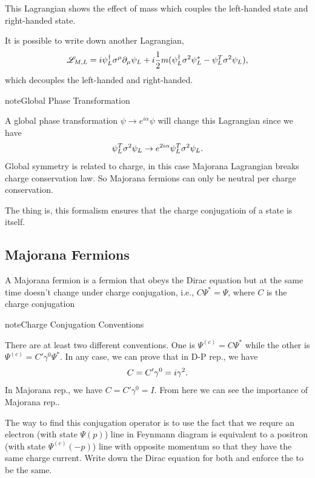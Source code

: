\documentclass[letterpaper,12pt,english]{sphinxmanual}
\begin{document}
This Lagrangian shows the effect of mass which couples the left-handed state and right-handed state.

It is possible to write down another Lagrangian,
\begin{gather}
\begin{split}\mathscr{L}_{M,L} = i\psi_L^\dagger \sigma^\mu \partial_\mu \psi_L + i \frac{1}{2}m( \psi_L^\dagger \sigma^2 \psi_L^* - \psi_L^T \sigma^2 \psi_L),\end{split}\notag
\end{gather}
which decouples the left-handed and right-handed.

\begin{notice}{note}{Global Phase Transformation}

A global phase transformation \(\psi\to e^{i\alpha} \psi\) will change this Lagrangian since we have
\begin{gather}
\begin{split}\psi_L^T\sigma^2 \psi_L \to e^{2i\alpha}\psi_L^T \sigma^2 \psi_L.\end{split}\notag
\end{gather}
Global symmetry is related to charge, in this case Majorana Lagrangian breaks charge conservation law. So Majorana fermions can only be neutral per charge conservation.
\end{notice}

The thing is, this formalism ensures that the charge conjugatioin of a state is itself.


\subsection{Majorana Fermions}
\label{mass:majorana-fermions}
A Majorana fermion is a fermion that obeys the Dirac equation but at the same time doesn't change under charge conjugation, i.e., \(C \Psi^* = \Psi\), where \(C\) is the charge conjugation

\begin{notice}{note}{Charge Conjugation Conventions}

There are at least two different conventions. One is \(\Psi^{(c)} = C \Psi^*\) while the other is \(\Psi^{(c)} = C'\gamma^0 \Psi^*\). In any case, we can prove that in D-P rep., we have
\begin{gather}
\begin{split}C = C'\gamma^0 = i\gamma^2.\end{split}\notag
\end{gather}
In Majorana rep., we have \(C = C'\gamma^0 = I\). From here we can see the importance of Majorana rep..

The way to find this conjugation operator is to use the fact that we requre an electron (with state \(\Psi(p)\)) line in Feynmann diagram is equivalent to a positron (with state \(\Psi^{(c)}(-p)\)) line with opposite momentum so that they have the same charge current. Write down the Dirac equation for both and enforce the to be the same.
\end{notice}
\end{document}
